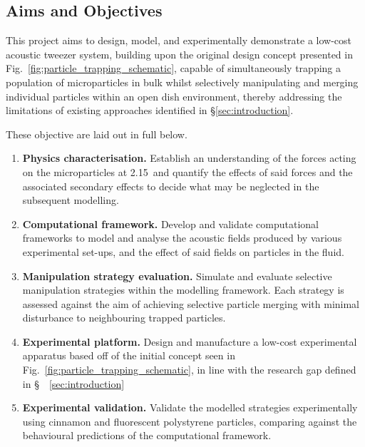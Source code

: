 \documentclass[11pt,a4paper]{article}
\begin{document}
\subsection{Aims and Objectives}
\label{subsec:aims}

This project aims to design, model, and experimentally demonstrate a low-cost acoustic tweezer system, building upon the original design concept presented in Fig.~\ref{fig:particle_trapping_schematic}, capable of simultaneously trapping a population of microparticles in bulk whilst selectively manipulating and merging individual particles within an open dish environment, thereby addressing the limitations of existing approaches identified in \S\ref{sec:introduction}.

These objective are laid out in full below.

\begin{enumerate}

    \item[\textbf{1}] \textbf{Physics characterisation.} 
    Establish an understanding of the forces acting on the microparticles at 2.15\, and quantify the effects of said forces and the associated secondary effects to decide what may be neglected in the subsequent modelling. 
    
    \item[\textbf{2}] \textbf{Computational framework.} 
    Develop and validate computational frameworks to model and analyse the acoustic fields produced by various experimental set-ups, and the effect of said fields on particles in the fluid.
    

    \item[\textbf{3}] \textbf{Manipulation strategy evaluation.} 
    Simulate and evaluate selective manipulation strategies within the modelling framework. Each strategy is assessed against the aim of achieving selective particle merging with minimal disturbance to neighbouring trapped particles.

    \item[\textbf{4}] \textbf{Experimental platform.} 
    Design and manufacture a low-cost experimental apparatus based off of the initial concept seen in Fig.~\ref{fig:particle_trapping_schematic}, in line with the research gap defined in \S~~\ref{sec:introduction}

    \item[\textbf{5}] \textbf{Experimental validation.} 
    Validate the modelled strategies experimentally using cinnamon and fluorescent polystyrene particles, comparing against the behavioural predictions of the computational framework. 

\end{enumerate}
\end{document}
